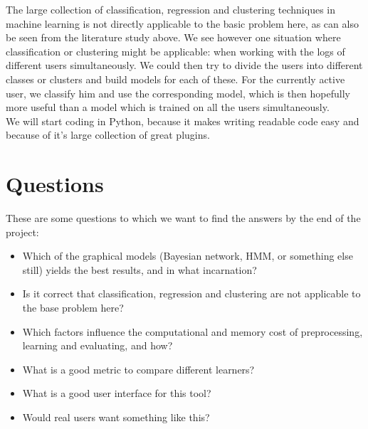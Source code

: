\documentclass[a4paper,11pt]{article}
\begin{document}
The large collection of classification, regression and clustering techniques in machine learning is not directly applicable to the basic problem here, as can also be seen from the literature study above. We see however one situation where classification or clustering might be applicable: when working with the logs of different users simultaneously. We could then try to divide the users into different classes or clusters and build models for each of these. For the currently active user, we classify him and use the corresponding model, which is then hopefully more useful than a model which is trained on all the users simultaneously.  \\[8pt]

We will start coding in Python, because it makes writing readable code easy and because of it’s large collection of great plugins.\\[8pt]


\section{Questions}

These are some questions to which we want to find the answers by the end of the project: \\[8pt]

\begin{itemize}
\item Which of the graphical models (Bayesian network, HMM, or something else still) yields the best results, and in what incarnation?
\item Is it correct that classification, regression and clustering are not applicable to the base problem here?
\item Which factors influence the computational and memory cost of preprocessing, learning and evaluating, and how?
\item What is a good metric to compare different learners?
\item What is a good user interface for this tool?
\item Would real users want something like this?
\end{itemize}
\\[16pt]




\end{document}
